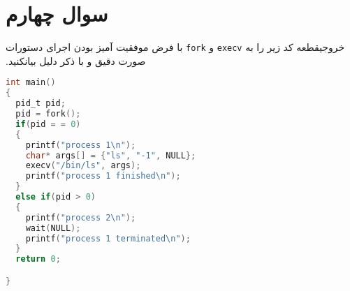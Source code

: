 \section{سوال چهارم}
‫با‬ ‫فرض‬ ‫موفقیت‬ ‫آمیز‬ ‫بودن‬ ‫اجرای‬ ‫دستورات‬ \texttt{fork} و ‫‪\texttt{execv}‬‬ ‫خروجی‬‫قطعه‬ ‫کد‬ ‫زیر‬ ‫را‬ ‫به‬ ‫صورت‬ ‫دقیق‬ ‫و‬ ‫با‬ ‫ذکر‬ ‫دلیل‬ بیان‬‫کنید.

\begin{latin}
\begin{lstlisting}[label=first,caption=Some Code, language=C]
int main()
{
  pid_t pid;
  pid = fork();
  if(pid = = 0)
  {
	printf("process 1\n");
	char* args[] = {"ls", "-1", NULL};
	execv("/bin/ls", args);
    printf("‫‪process‬‬ 1 finished\n");
  }
  else if(pid > 0)
  {
  	printf("‫‪process‬‬ 2\n");
  	wait(NULL);
  	printf("‫‪process‬‬ 1 ‫‪terminated‬‬\n");
  }
  return 0;

}
\end{lstlisting}
\end{latin}

